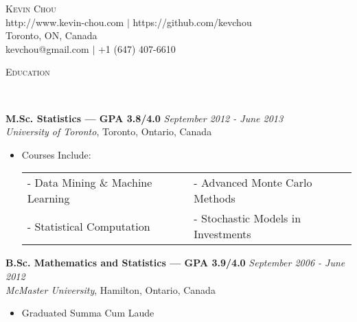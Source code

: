 \documentclass[9pt]{article}
\newenvironment{changemargin}[2]{%
  \begin{list}{}{%
    \setlength{\topsep}{0pt}%
    \setlength{\leftmargin}{#1}%
    \setlength{\rightmargin}{#2}%
    \setlength{\listparindent}{\parindent}%
    \setlength{\itemindent}{\parindent}%
    \setlength{\parsep}{\parskip}%
  }%
  \item[]}{\end{list}
}
\newcommand{\lineover}{
  \begin{changemargin}{-0.05in}{-0.05in}
    \vspace*{-8pt}
    \hrulefill \\
    \vspace*{-2pt}
  \end{changemargin}
}
\newcommand{\header}[1]{
  \begin{changemargin}{-0.5in}{-0.5in}
    {\large \scshape{#1}}\\
    \lineover
  \end{changemargin}
}
\newcommand{\contact}[4]{
  \begin{changemargin}{-0.5in}{-0.5in}
    \begin{center}
      {\Large \scshape {#1}}\\ \smallskip
      {#2}\\ \smallskip
      {#3}\\ \smallskip
      {#4}\smallskip
    \end{center}
  \end{changemargin}
}
\newenvironment{body} {
  \vspace*{-16pt}
  \begin{changemargin}{-0.25in}{-0.5in}
  }
  {\end{changemargin}
}
\begin{document}

\contact{Kevin Chou}{http://www.kevin-chou.com $|$ https://github.com/kevchou}{Toronto, ON, Canada}{kevchou@gmail.com $|$ +1 (647) 407-6610}

\header{Education}

\begin{body}
  \vspace{14pt}
  \textbf{M.Sc. Statistics --- GPA 3.8/4.0}{} \hfill \emph{September 2012 - June 2013}{} \\
  \emph{University of Toronto}, Toronto, Ontario, Canada \\
    \begin{itemize}
    \item Courses Include:\\
  \vspace{0.1cm}
  \hspace{0.1cm}
  \begin{tabular}{l l}
  \vspace{0.1cm}
        -\hspace{0.05cm} Data Mining \& Machine Learning & -\hspace{0.05cm} Advanced Monte Carlo Methods \\
        \vspace{0.1cm}
        -\hspace{0.05cm} Statistical Computation  & -\hspace{0.05cm} Stochastic Models in Investments   \\
  \end{tabular}
  \end{itemize}

  \textbf{B.Sc. Mathematics and Statistics --- GPA 3.9/4.0} \hfill \emph{September 2006 - June 2012} \\
  \emph{McMaster University}, Hamilton, Ontario, Canada\\
  \begin{itemize}
        \item Graduated Summa Cum Laude
  \end{itemize}
\end{body}
\end{document}
